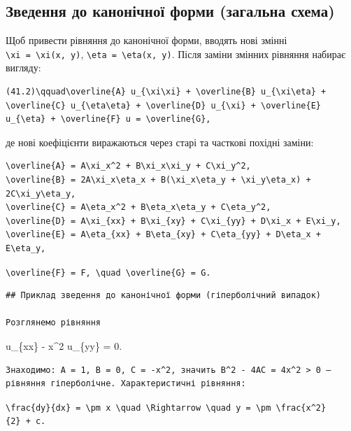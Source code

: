 \documentclass[
  ukrainian,
]{article}
\begin{document}
\subsection{Зведення до канонічної форми (загальна
схема)}\label{ux437ux432ux435ux434ux435ux43dux43dux44f-ux434ux43e-ux43aux430ux43dux43eux43dux456ux447ux43dux43eux457-ux444ux43eux440ux43cux438-ux437ux430ux433ux430ux43bux44cux43dux430-ux441ux445ux435ux43cux430}

Щоб привести рівняння до канонічної форми, вводять нові змінні
\texttt{\textbackslash{}xi\ =\ \textbackslash{}xi(x,\ y)},
\texttt{\textbackslash{}eta\ =\ \textbackslash{}eta(x,\ y)}. Після
заміни змінних рівняння набирає вигляду:

\begin{verbatim}
(41.2)\qquad\overline{A} u_{\xi\xi} + \overline{B} u_{\xi\eta} + \overline{C} u_{\eta\eta} + \overline{D} u_{\xi} + \overline{E} u_{\eta} + \overline{F} u = \overline{G},
\end{verbatim}

де нові коефіцієнти виражаються через старі та часткові похідні заміни:

\begin{verbatim}
\overline{A} = A\xi_x^2 + B\xi_x\xi_y + C\xi_y^2,
\overline{B} = 2A\xi_x\eta_x + B(\xi_x\eta_y + \xi_y\eta_x) + 2C\xi_y\eta_y,
\overline{C} = A\eta_x^2 + B\eta_x\eta_y + C\eta_y^2,
\overline{D} = A\xi_{xx} + B\xi_{xy} + C\xi_{yy} + D\xi_x + E\xi_y,
\overline{E} = A\eta_{xx} + B\eta_{xy} + C\eta_{yy} + D\eta_x + E\eta_y,
\end{verbatim}

\texttt{\textbackslash{}overline\{F\}\ =\ F,\ \textbackslash{}quad\ \textbackslash{}overline\{G\}\ =\ G.}

\begin{verbatim}
## Приклад зведення до канонічної форми (гіперболічний випадок)

Розглянемо рівняння
\end{verbatim}

u\_\{xx\} - x\^{}2 u\_\{yy\} = 0.

\begin{verbatim}
Знаходимо: A = 1, B = 0, C = -x^2, значить B^2 - 4AC = 4x^2 > 0 — рівняння гіперболічне. Характеристичні рівняння:
\end{verbatim}

\texttt{\textbackslash{}frac\{dy\}\{dx\}\ =\ \textbackslash{}pm\ x\ \textbackslash{}quad\ \textbackslash{}Rightarrow\ \textbackslash{}quad\ y\ =\ \textbackslash{}pm\ \textbackslash{}frac\{x\^{}2\}\{2\}\ +\ c.}
\end{document}
